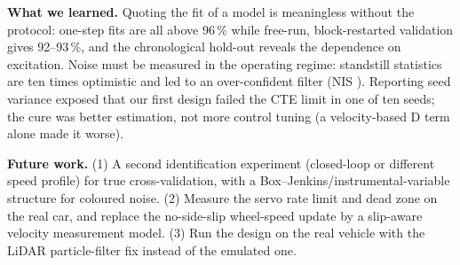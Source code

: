 \documentclass[conference]{IEEEtran}
\begin{document}
\textbf{What we learned.} Quoting the fit of a model is meaningless without the protocol: one-step fits are all above 96\,\% while free-run, block-restarted validation gives 92--93\,\%, and the chronological hold-out reveals the dependence on excitation. Noise must be measured in the operating regime: standstill statistics are ten times optimistic and led to an over-confident filter (NIS \realNISstand). Reporting seed variance exposed that our first design failed the CTE limit in one of ten seeds; the cure was better estimation, not more control tuning (a velocity-based D term alone made it worse).

\textbf{Future work.} (1) A second identification experiment (closed-loop or different speed profile) for true cross-validation, with a Box--Jenkins/instrumental-variable structure for coloured noise. (2) Measure the servo rate limit and dead zone on the real car, and replace the no-side-slip wheel-speed update by a slip-aware velocity measurement model. (3) Run the design on the real vehicle with the LiDAR particle-filter fix instead of the emulated one.

\footnotesize

\end{document}
